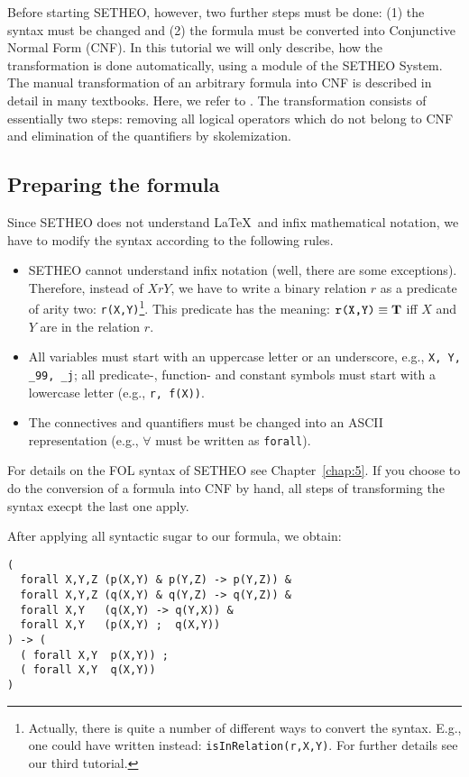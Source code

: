 Before starting SETHEO, however, two further steps must be done:
(1) the syntax must be changed and
(2) the formula must be converted into Conjunctive Normal Form (CNF).
In this tutorial we will only describe, how the transformation is done
automatically, using a module of the SETHEO System.
The manual transformation of an arbitrary formula into CNF is described
in detail in many textbooks. Here, we refer to \cite{Lov78,Chang75}.
The transformation consists of essentially two steps: 
removing all logical operators which do not belong to CNF and
elimination of the quantifiers by skolemization.

\subsection{Preparing the formula}

Since SETHEO does not understand \LaTeX\ and infix mathematical
notation, we have to modify the syntax according to the following
rules.

\begin{itemize}
\item
SETHEO cannot understand infix notation (well, there are some exceptions).
Therefore, instead of $XrY$, we have to write a binary relation $r$
as a predicate of arity two: {\tt r(X,Y)}\footnote{
	Actually, there is quite a number of different ways to
	convert the syntax. E.g., one could have written instead:
	{\tt isInRelation(r,X,Y)}. For further details see our third
	tutorial.}.
This predicate has the meaning: $\mbox{{\tt r(X,Y)}} \equiv {\rm\bf T}$
iff $X$ and $Y$ are in the relation $r$.

\item
All variables must start with an uppercase letter or an underscore,
e.g., {\tt X, Y, \_99, \_j}; all
predicate-, function- and constant symbols must start with a lowercase
letter (e.g., {\tt r, f(X))}.

\item
The connectives and quantifiers must be changed into an ASCII representation
(e.g., $\forall$ must be written as {\tt forall}).
\end{itemize}

For details on the FOL syntax of SETHEO see Chapter~\ref{chap:5}.
If you choose to do the conversion of a formula into CNF by hand,
all steps of transforming the syntax execpt the last one apply.

After applying all syntactic sugar to our formula, we obtain:
\begin{verbatim}
( 
  forall X,Y,Z (p(X,Y) & p(Y,Z) -> p(Y,Z)) &
  forall X,Y,Z (q(X,Y) & q(Y,Z) -> q(Y,Z)) &
  forall X,Y   (q(X,Y) -> q(Y,X)) &
  forall X,Y   (p(X,Y) ;  q(X,Y)) 
) -> (
  ( forall X,Y  p(X,Y)) ; 
  ( forall X,Y  q(X,Y)) 
)
\end{verbatim}

